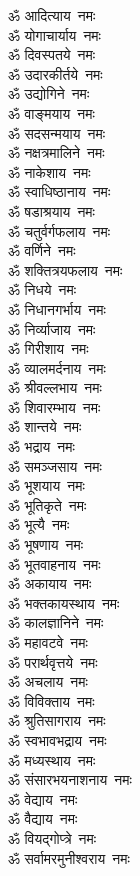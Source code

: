 \begin{multicols}{2}
\begin{flushleft}
ॐ आदित्याय~नमः\\
ॐ योगाचार्याय~नमः\\
ॐ दिवस्पतये~नमः\\
ॐ उदारकीर्तये~नमः\hfill{}\\
ॐ उद्योगिने~नमः\\
ॐ वाङ्मयाय~नमः\\
ॐ सदसन्मयाय~नमः\\
ॐ नक्षत्रमालिने~नमः\\
ॐ नाकेशाय~नमः\\
ॐ स्वाधिष्ठानाय~नमः\\
ॐ षडाश्रयाय~नमः\\
ॐ चतुर्वर्गफलाय~नमः\\
ॐ वर्णिने~नमः\\
ॐ शक्तित्रयफलाय~नमः\hfill{}\\
ॐ निधये~नमः\\
ॐ निधानगर्भाय~नमः\\
ॐ निर्व्याजाय~नमः\\
ॐ गिरीशाय~नमः\\
ॐ व्यालमर्दनाय~नमः\\
ॐ श्रीवल्लभाय~नमः\\
ॐ शिवारम्भाय~नमः\\
ॐ शान्तये~नमः\\
ॐ भद्राय~नमः\\
ॐ समञ्जसाय~नमः\hfill{}\\
ॐ भूशयाय~नमः\\
ॐ भूतिकृते~नमः\\
ॐ भूत्यै~नमः\\
ॐ भूषणाय~नमः\\
ॐ भूतवाहनाय~नमः\\
ॐ अकायाय~नमः\\
ॐ भक्तकायस्थाय~नमः\\
ॐ कालज्ञानिने~नमः\\
ॐ महावटवे~नमः\\
ॐ परार्थवृत्तये~नमः\hfill{}\\
ॐ अचलाय~नमः\\
ॐ विविक्ताय~नमः\\
ॐ श्रुतिसागराय~नमः\\
ॐ स्वभावभद्राय~नमः\\
ॐ मध्यस्थाय~नमः\\
ॐ संसारभयनाशनाय~नमः\\
ॐ वेद्याय~नमः\\
ॐ वैद्याय~नमः\\
ॐ वियद्गोप्त्रे~नमः\\
ॐ सर्वामरमुनीश्वराय~नमः\hfill{}\\

\end{flushleft}
\end{multicols}
